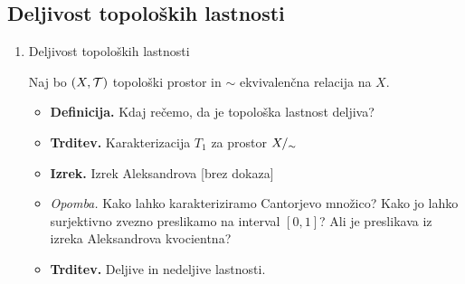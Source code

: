 \subsection{Deljivost topoloških lastnosti}
\begin{enumerate}
    \item Deljivost topoloških lastnosti
    
    Naj bo \((X, \mathcal{T})\) topološki prostor in \(\sim\) ekvivalenčna relacija na \(X\).
    \begin{itemize}
        \item \colorbox{purple!30}{\textbf{Definicija.}} Kdaj rečemo, da je topološka lastnost deljiva?
        \item \colorbox{blue!30}{\textbf{Trditev.}} Karakterizacija \(T_1\) za prostor \({X/_\sim}\)
        \item \colorbox{blue!30}{\textbf{Izrek.}} Izrek Aleksandrova [brez dokaza]
        \item \colorbox{yellow!30}{\emph{Opomba.}} Kako lahko karakteriziramo Cantorjevo množico? Kako jo lahko surjektivno zvezno preslikamo na interval \([0,1]\)? Ali je preslikava iz izreka Aleksandrova kvocientna?
        \item \colorbox{blue!30}{\textbf{Trditev.}} Deljive in nedeljive lastnosti. 
    \end{itemize}
\end{enumerate}

